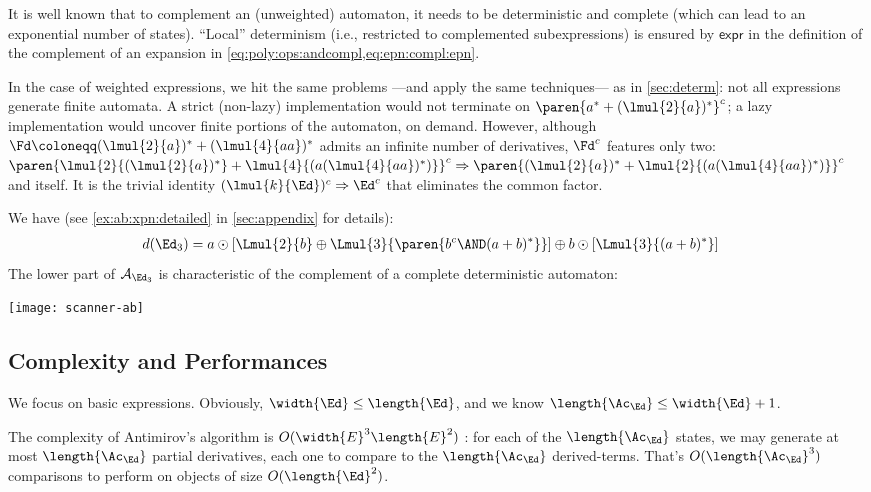 \documentclass[a4paper,USenglish]{lipics}
\begin{document}
It is well known that to complement an (unweighted) automaton, it needs to
be deterministic and complete (which can lead to an exponential number of
states).  ``Local'' determinism (i.e., restricted to complemented
subexpressions) is ensured by $\mathsf{expr}$ in the definition of the
complement of an expansion in \cref{eq:poly:ops:andcompl,eq:epn:compl:epn}.

In the case of weighted expressions, we hit the same problems ---and apply
the same techniques--- as in \cref{sec:determ}: not all expressions generate
finite automata.  A strict (non-lazy) implementation would not terminate on
$\paren{a^*+(\lmul{2}{a})^*}^c$; a lazy implementation would uncover finite
portions of the automaton, on demand.  However, although
$\Fd \coloneqq (\lmul{2}{a})^*+(\lmul{4}{aa})^*$ admits an infinite number
of derivatives, $\Fd^c$ features only two:
$\paren{\lmul{2}{(\lmul{2}{a})^*} + \lmul{4}{(a(\lmul{4}{aa})^*)}}^c
\Rightarrow \paren{(\lmul{2}{a})^* + \lmul{2}{(a(\lmul{4}{aa})^*)}}^c$
and itself.  It is the trivial identity
$(\lmul{k}{\Ed})^c \Rightarrow \Ed^c$ that eliminates the common factor.

\begin{Example}
  \label{ex:ab:xpn}We have (see \cref{ex:ab:xpn:detailed} in \cref{sec:appendix} for
  details):
  \begin{align*}
    d(\Ed_3)
    &= a \odot [\Lmul{2}{b} \oplus \Lmul{3}{\paren{b^{c} \AND (a+b)^*}}]
      \oplus b \odot [\Lmul{3}{(a+b)^*}]
  \end{align*}\label{ex:ab:aut}The lower part of $\mathcal{A}_{\Ed_3}$ is characteristic of the
  complement of a complete deterministic automaton:
  \\[-1ex]
  \centerline{\texttt{[image: scanner-ab]}}
\end{Example}
\vspace{-10mm}

\subsection{Complexity and Performances}
\label{sec:perfs}
We focus on basic expressions.  Obviously, $\width{\Ed} \le \length{\Ed}$,
and we know $\length{\Ac_\Ed} \le \width{\Ed} + 1$.

The complexity of Antimirov's algorithm is $O(\width{E}^3\length{E}^2)$
\citep{champarnaud.2002.tcs}: for each of the $\length{\Ac_\Ed}$ states, we
may generate at most $\length{\Ac_\Ed}$ partial derivatives, each one to
compare to the $\length{\Ac_\Ed}$ derived-terms.  That's
$O(\length{\Ac_\Ed}^3)$ comparisons to perform on objects of size
$O(\length{\Ed}^2)$.
\end{document}
